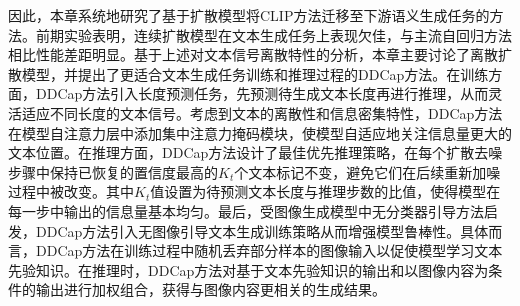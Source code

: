 因此，本章系统地研究了基于扩散模型将CLIP方法迁移至下游语义生成任务的方法。前期实验表明，连续扩散模型在文本生成任务上表现欠佳，与主流自回归方法\cite{OSCAR,VinVL,UFO,ViTCap,SimVLM,GIT}相比性能差距明显。基于上述对文本信号离散特性的分析，本章主要讨论了离散扩散模型\cite{VQ-diffusion}，并提出了更适合文本生成任务训练和推理过程的DDCap方法。在训练方面，DDCap方法引入长度预测任务，先预测待生成文本长度再进行推理，从而灵活适应不同长度的文本信号。考虑到文本的离散性和信息密集特性，DDCap方法在模型自注意力层中添加集中注意力掩码模块，使模型自适应地关注信息量更大的文本位置。在推理方面，DDCap方法设计了最佳优先推理策略，在每个扩散去噪步骤中保持已恢复的置信度最高的$K_{t}$个文本标记不变，避免它们在后续重新加噪过程中被改变。其中$K_{t}$值设置为待预测文本长度与推理步数的比值，使得模型在每一步中输出的信息量基本均匀。最后，受图像生成模型中无分类器引导方法\cite{glide}启发，DDCap方法引入无图像引导文本生成训练策略从而增强模型鲁棒性。具体而言，DDCap方法在训练过程中随机丢弃部分样本的图像输入以促使模型学习文本先验知识。在推理时，DDCap方法对基于文本先验知识的输出和以图像内容为条件的输出进行加权组合，获得与图像内容更相关的生成结果。


